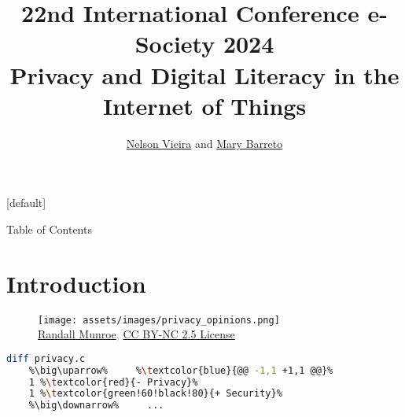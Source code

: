 \documentclass[xcolor={svgnames},compress,aspectratio=169]{beamer}
\title[Privacy and Digital Literacy in the Internet of Things]{{\normalsize 22nd International Conference e-Society 2024} \\ Privacy and Digital Literacy in the Internet of Things}
\author{\href{mailto:2080511@student.uma.pt}{Nelson Vieira} and \href{mailto:mary.barreto@staff.uma.pt}{Mary Barreto}}
\institute[\href{https://www.uma.pt/}{University of Madeira}]{University of Madeira\\Faculty of Exact Sciences and Engineering}
\makeatletter
\newenvironment{withoutheadline}{
        \setbeamertemplate{headline}[default]
        \def\beamer@entrycode{\vspace*{-\headheight}}
    }{}
\makeatother
\begin{document}
\begin{withoutheadline}
    \begin{frame}
        \maketitle
    \end{frame}
\end{withoutheadline}

\begin{frame}{Table of Contents}
    \begin{multicols}{2}
        \tableofcontents
    \end{multicols}
\end{frame}

\section{Introduction}

\begin{frame}[fragile]
    \begin{multicols}{2}
        \centering
        \begin{figure}
            \centering\texttt{[image: assets/images/privacy\_opinions.png]}\\
            \textcolor{gray}{{\tiny \textcopyright \href{https://xkcd.com/1269/}{Randall Munroe}, \href{https://creativecommons.org/licenses/by-nc/2.5/}{CC BY-NC 2.5 License}}}
        \end{figure}

        \columnbreak
        \vspace*{\fill}
\begin{lstlisting}[language=sh,escapechar=\%]
    diff privacy.c
    %\big\uparrow%     %\textcolor{blue}{@@ -1,1 +1,1 @@}%
    1 %\textcolor{red}{- Privacy}%
    1 %\textcolor{green!60!black!80}{+ Security}%
    %\big\downarrow%     ...
\end{lstlisting}
        \vspace*{\fill}
    \end{multicols}
\end{frame}

\end{document}
